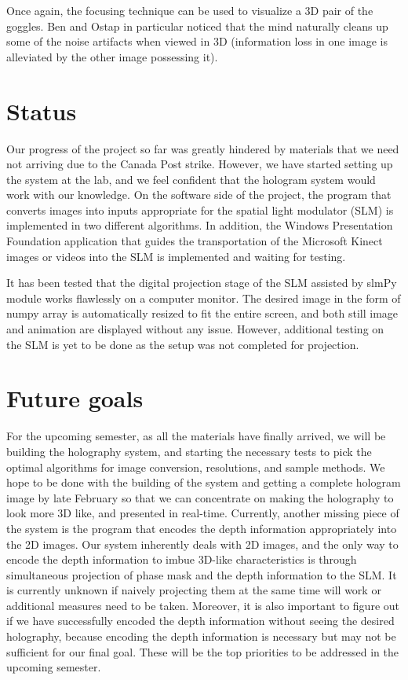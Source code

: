 \documentclass[12pt]{article}
\begin{document}
Once again, the focusing technique can be used to visualize a 3D pair of the goggles. Ben and Ostap in particular noticed that the mind naturally cleans up some of the noise artifacts when viewed in 3D (information loss in one image is alleviated by the other image possessing it).

\section{Status}
Our progress of the project so far was greatly hindered by materials that we need not arriving due to the Canada Post strike. However, we have started setting up the system at the lab, and we feel confident that the hologram system would work with our knowledge. On the software side of the project, the program that converts images into inputs appropriate for the spatial light modulator (SLM) is implemented in two different algorithms. In addition, the Windows Presentation Foundation application that guides the transportation of the Microsoft Kinect images or videos into the SLM is implemented and waiting for testing.

It has been tested that the digital projection stage of the SLM assisted by slmPy module works flawlessly on a computer monitor. The desired image in the form of numpy array is automatically resized to fit the entire screen, and both still image and animation are displayed without any issue. However, additional testing on the SLM is yet to be done as the setup was not completed for projection. 

\section{Future goals}
For the upcoming semester, as all the materials have finally arrived, we will be building the holography system, and starting the necessary tests to pick the optimal algorithms for image conversion, resolutions, and sample methods. We hope to be done with the building of the system and getting a complete hologram image by late February so that we can concentrate on making the holography to look more 3D like, and presented in real-time. Currently, another missing piece of the system is the program that encodes the depth information appropriately into the 2D images. Our system inherently deals with 2D images, and the only way to encode the depth information to imbue 3D-like characteristics is through simultaneous projection of phase mask and the depth information to the SLM. It is currently unknown if naively projecting them at the same time will work or additional measures need to be taken. Moreover, it is also important to figure out if we have successfully encoded the depth information without seeing the desired holography, because encoding the depth information is necessary but may not be sufficient for our final goal. These will be the top priorities to be addressed in the upcoming semester.
\end{document}
